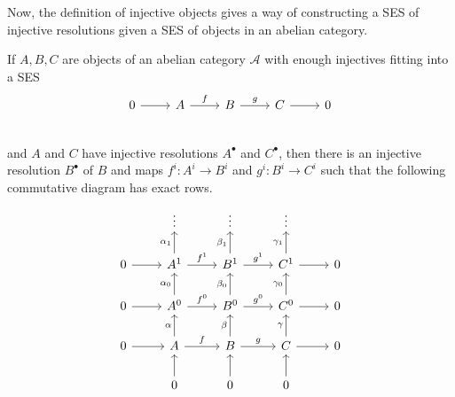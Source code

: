 Now, the definition of injective objects gives a way of constructing a SES
of injective resolutions given a SES of objects in an abelian category.
\begin{lemm}\label{lemm:ses_of_resolutions}
  If $A, B, C$ are objects of an abelian category $\mathcal{A}$ with enough
  injectives fitting into a SES
  \[\begin{tikzcd}
      0\rar & A\rar{f} & B\rar{g} & C\rar & 0 \\
    \end{tikzcd}\]
  and $A$ and $C$ have injective resolutions $A^{\bullet}$ and $C^{\bullet}$,
  then there is an injective resolution $B^{\bullet}$ of $B$ and maps
  $f^{i}:A^{i}\to B^{i}$ and $g^{i}:B^{i}\to C^{i}$ such that the following
  commutative diagram has exact rows.
\[\begin{tikzcd}
    & \vdots & \vdots & \vdots & \\
    0\rar & A^{1}\rar{f^{1}}\uar{\alpha_{1}} & B^{1}\rar{g^{1}}\uar{\beta_{1}}
    & C^{1}\rar\uar{\gamma_{1}} & 0 \\
    0\rar & A^{0}\rar{f^{0}}\uar{\alpha_{0}} & B^{0}\rar{g^{0}}\uar{\beta_{0}}
    & C^{0}\rar\uar{\gamma_{0}} & 0 \\
    0\rar& A\rar{f}\uar{\alpha} & B\rar{g}\uar{\beta} & C\rar\uar{\gamma}&0\\
    & 0\uar & 0\uar & 0\uar &
  \end{tikzcd}\]
\end{lemm}
